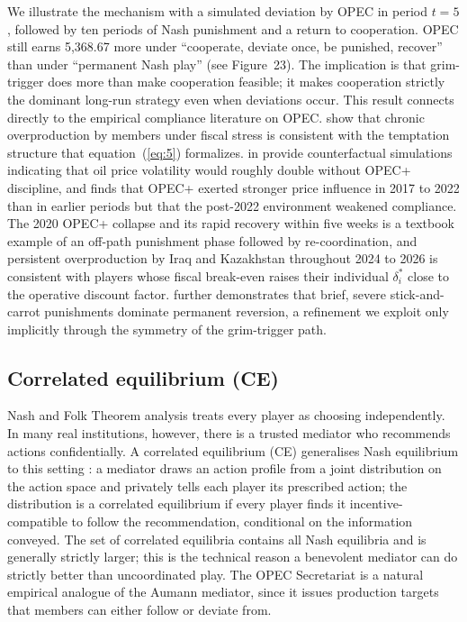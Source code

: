 We illustrate the mechanism with a simulated deviation by OPEC in period
$t = 5$, followed by ten periods of Nash punishment and a return to
cooperation. OPEC still earns 5,368.67 more under ``cooperate, deviate
once, be punished, recover'' than under ``permanent Nash play'' (see
Figure~23). The implication is that grim-trigger does more than make
cooperation feasible; it makes cooperation strictly the dominant
long-run strategy even when deviations occur. This result connects
directly to the empirical compliance literature on OPEC.
\citet{burbidge1997} show that chronic overproduction by members under
fiscal stress is consistent with the temptation structure that
equation~(\ref{eq:5}) formalizes. \citet{almutairi2025} in 
provide counterfactual simulations indicating that oil price volatility
would roughly double without OPEC+ discipline, and \citet{montant2025}
finds that OPEC+ exerted stronger price influence in 2017 to 2022 than
in earlier periods but that the post-2022 environment weakened
compliance. The 2020 OPEC+ collapse and its rapid recovery within five
weeks is a textbook example of an off-path punishment phase followed by
re-coordination, and persistent overproduction by Iraq and Kazakhstan
throughout 2024 to 2026 is consistent with players whose fiscal
break-even raises their individual $\delta_i^*$ close to the operative
discount factor. \citet{abreu1986} further demonstrates that brief,
severe stick-and-carrot punishments dominate permanent reversion, a
refinement we exploit only implicitly through the symmetry of the
grim-trigger path.

\subsection{Correlated equilibrium (CE)}
\label{subsec:ce}

Nash and Folk Theorem analysis treats every player as choosing
independently. In many real institutions, however, there is a trusted
mediator who recommends actions confidentially. A correlated equilibrium
(CE) generalises Nash equilibrium to this setting \citep{aumann1974}: a
mediator draws an action profile from a joint distribution on the action
space and privately tells each player its prescribed action; the
distribution is a correlated equilibrium if every player finds it
incentive-compatible to follow the recommendation, conditional on the
information conveyed. The set of correlated equilibria contains all Nash
equilibria and is generally strictly larger; this is the technical
reason a benevolent mediator can do strictly better than uncoordinated
play. The OPEC Secretariat is a natural empirical analogue of the
Aumann mediator, since it issues production targets that members can
either follow or deviate from.

